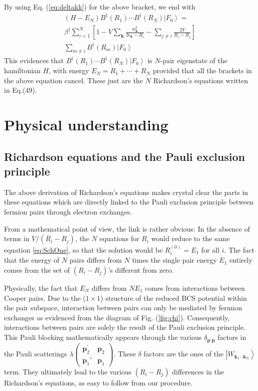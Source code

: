\documentclass[epj]{svjour}
\newcommand{\vk}{\ensuremath{\mathbf{k}}}
\newcommand{\vp}{\ensuremath{\mathbf{p}}}
\begin{document}
By using  Eq. (\ref{eq:deltakk}) for the above bracket, we end with  
\begin{multline}  
(H-E _N)B^{\dagger}(R_1)\cdots{}B^{\dagger}(R_N)\left|F_0%
\right>  = \\
\beta^\dagger\sum_{i=1}^N\left[1-V\sum_\vk\frac{w_{\mathbf{k} }^2}{2\epsilon_{\mathbf{k}}-R_i}-\sum_{j\neq{}i}\frac{2V%
}{R_i-R_j}\right]\\
\sum_{m\neq{i}}B^{\dagger}(R_m)\left|F_0\right>  
\end{multline}
This evidences that $B^{\dagger}(R_1)\cdots{}B^{\dagger}(R_N)\left|F_0\right> $ is $N$-pair eigenstate of the hamiltonian $H$, with energy $E_N=R_1+\cdots+R_N$ provided that all the brackets in the above equation cancel. These just are the $N$ Richardson's equations written in Eq.(49).
\section{Physical understanding\label{sec:understanding}}

\subsection{Richardson equations and the Pauli exclusion principle}

The above  derivation of Richardson's equations makes crystal clear the parts in these equations which are directly linked
to the Pauli exclusion principle between fermion pairs through electron exchanges. 

From a mathematical point of view, the link is rather obvious: In the
absence of terms in $V/(R_i-R_j)$, the $N$ equations for $R_i$ would reduce to
the same equation \eqref{eq:SchOne}, so that the solution would be $R^{(0)}_i=%
E _1$ for all $i$. The fact that the energy of $N$ pairs differs
from $N$ times the single pair energy $E_1$ entirely comes from the set of $(R_i-R_j)$'s
different from zero.

Physically, the fact that $E _N$ differs from $NE _1$
comes from interactions between Cooper pairs. Due to the ($1\times1$) structure of the reduced BCS
potential within the pair subspace, interaction between pairs can only be mediated by fermion
exchanges as evidenced from the diagram of Fig. (\ref{fig:chi}). 
Consequently, interactions between pairs
are solely the result of the Pauli exclusion principle. This
Pauli blocking mathematically appears through the various $\delta_{\mathbf{p}
^{\prime}\mathbf{p} }$ factors in the Pauli scatterings $\lambda(%
\begin{smallmatrix}\vp^\prime_2&\vp_2\\\vp_1'&\vp_1\end{smallmatrix})  $. These $\delta$ factors are the ones of the $\left|W_{\mathbf{k} _1\cdots\mathbf{k} _N}\right>$ term.  They ultimately lead to the various $(R_i-R_j)$ differences
 in the Richardson's equations, as easy to follow from our procedure.
\end{document}
